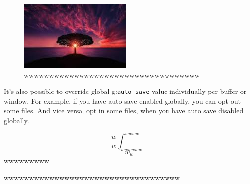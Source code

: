 \documentclass[professionalfont, aspectratio=169]{beamer}
\begin{document}
\begin{frame}
	\begin{figure}
		\begin{center}
			\includegraphics[width=0.3\linewidth]{screenshot002}
		\end{center}
		\caption{wwwwwwwwwwwwwwwwwwwwwwwwwwwwwwwwwww}
		\label{fig:}
	\end{figure}
	It's also possible to override global g:\lstinline{auto_save} value individually per buffer or window. For example, if you have auto save enabled globally, you can opt out some files. And vice versa, opt in some files, when you have auto save disabled globally.


	\begin{equation}
		\frac{w}{w}	\int_{wwwwww}^{wwww}
		\label{www}
	\end{equation}
	\begin{equation}
		w_w
		\label{wwwwww}
	\end{equation}
	wwwwwwwww
\end{frame}


\begin{beamer}
	wwwwwwwwwwwwwwwwwwwwwwwwwwwwwwwwwww
\end{beamer}
\end{document}
